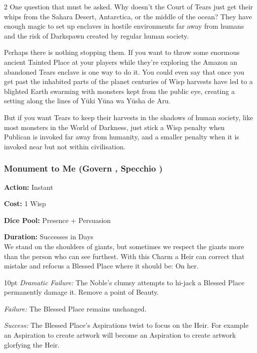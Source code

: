 \begin{multicols}{2}
One question that must be asked. Why doesn't the Court of Tears just get their whips from the Sahara Desert, Antarctica, or the middle of the ocean? They have enough magic to set up enclaves in hostile environments far away from humans and the risk of Darkspawn created by regular human society. 

Perhaps there is nothing stopping them. If you want to throw some enormous ancient Tainted Place at your players while they're exploring the Amazon an abandoned Tears enclave is one way to do it. You could even say that once you get past the inhabited parts of the planet centuries of Wisp harvests have led to a blighted Earth swarming with monsters kept from the public eye, creating a setting along the lines of Y\={u}ki Y\={u}na wa Y\={u}sha de Aru. 

But if you want Tears to keep their harvests in the shadows of human society, like most monsters in the World of Darkness, just stick a Wisp penalty when Publican is invoked far away from humanity, and a smaller penalty when it is invoked near but not within civilisation. 

\bigsidebarend

\subsubsection*{Monument to Me (Govern \textbullet\textbullet\textbullet, Specchio \textbullet\textbullet\textbullet)}

\noindent \textbf{Action:} Instant

\noindent \textbf{Cost:} 1 Wisp

\noindent \textbf{Dice Pool:} Presence + Persuasion

\noindent \textbf{Duration:} Successes in Days \\

\noindent We stand on the shoulders of giants, but sometimes we respect the giants more than the person who can see furthest. With this Charm a Heir can correct that mistake and refocus a Blessed Place where it should be: On her. 

\begin{myindentpar}{10pt} \emph{Dramatic Failure:} The Noble's clumsy attempts to hi-jack a Blessed Place permanently damage it. Remove a point of Beauty. 

\emph{Failure:} The Blessed Place remains unchanged.

\emph{Success:} The Blessed Place's Aspirations twist to focus on the Heir. For example an Aspiration to create artwork will become an Aspiration to create artwork glorfying the Heir. 


\end{myindentpar}
\end{multicols}
